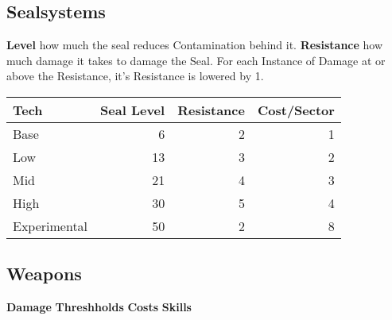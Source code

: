 \subsection{Sealsystems}\label{subsec:sealsystems}
\textbf{Level} how much the seal reduces Contamination behind it.
\textbf{Resistance} how much damage it takes to damage the Seal.
For each Instance of Damage at or above the Resistance, it's Resistance is lowered by 1.

\begin{tabular}{l|r|r|r}
    Tech & Seal Level & Resistance & Cost/Sector\\\hline
    Base &  6 & 2 & 1\\
    Low &   13& 3 & 2\\
    Mid &   21& 4 & 3\\
    High &  30& 5 & 4\\
    Experimental& 50 & 2 &8
\end{tabular}\par

\subsection{Weapons}\label{subsec:weapons}
\textbf{Damage}
\textbf{Threshholds}
\textbf{Costs}
\textbf{Skills}

